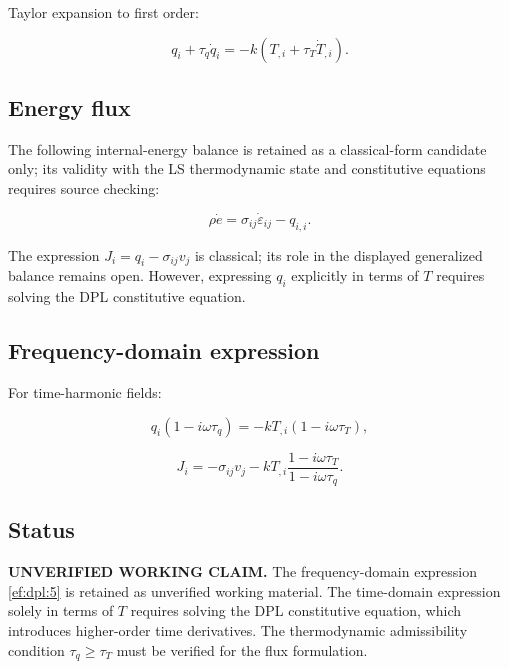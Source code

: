 Taylor expansion to first order:

\begin{equation}
q_i + \tau_q\dot{q}_i = -k(T_{,i} + \tau_T\dot{T}_{,i}).
\label{ef:dpl:2}
\end{equation}

\subsection{Energy flux}

The following internal-energy balance is retained as a classical-form candidate only; its validity with the LS thermodynamic state and constitutive equations requires source checking:

\begin{equation}
\rho\dot{e} = \sigma_{ij}\dot{\varepsilon}_{ij} - q_{i,i}.
\label{ef:dpl:3}
\end{equation}

The expression $J_i=q_i-\sigma_{ij}v_j$ is classical; its role in the displayed generalized balance remains open. However, expressing $q_i$ explicitly in terms of $T$ requires solving the DPL constitutive equation.

\subsection{Frequency-domain expression}

For time-harmonic fields:

\begin{equation}
q_i(1 - i\omega\tau_q) = -k T_{,i}(1 - i\omega\tau_T),
\label{ef:dpl:4}
\end{equation}

\begin{equation}
J_i = -\sigma_{ij}v_j - k T_{,i}\frac{1 - i\omega\tau_T}{1 - i\omega\tau_q}.
\label{ef:dpl:5}
\end{equation}

\subsection{Status}

\textbf{UNVERIFIED WORKING CLAIM.} The frequency-domain expression \eqref{ef:dpl:5} is retained as unverified working material. The time-domain expression solely in terms of $T$ requires solving the DPL constitutive equation, which introduces higher-order time derivatives. The thermodynamic admissibility condition $\tau_q \geq \tau_T$ must be verified for the flux formulation.


